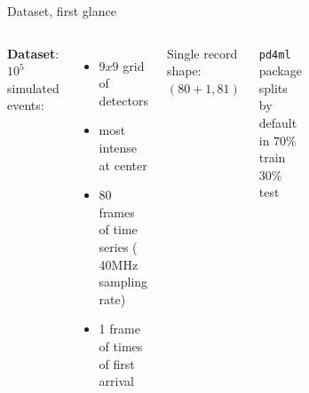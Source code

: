 \documentclass{beamer}
\begin{document}
\begin{frame}{Dataset, first glance}

    \begin{columns}
    
    \textbf{Dataset}: $10^5$ simulated events:
    \vspace{5 pt}

    \begin{itemize}
        \item[\textbullet] $9 x 9$ grid of detectors
        \item[\textbullet] most intense at center 
        \item[\textbullet] 80 frames of time series ($40$MHz sampling rate)
        \item[\textbullet] 1 frame of times of first arrival 
    \end{itemize}
    \vspace{10 pt}

    Single record shape: $(80 + 1 , 81)$\\
    \vspace{15 pt}

    \texttt{pd4ml} package splits by default in $70\%$ train $30\%$ test
    
    
        \begin{figure}
            \centering
            \includegraphics[width=0.8\textwidth]{figures/toa.png}
        \end{figure}
        
         \begin{figure}
            \centering
            \includegraphics[width=0.65\textwidth]{figures/ezgif.com-gif-maker.png}
        \end{figure}
    

\end{columns}
\end{frame}
\end{document}
